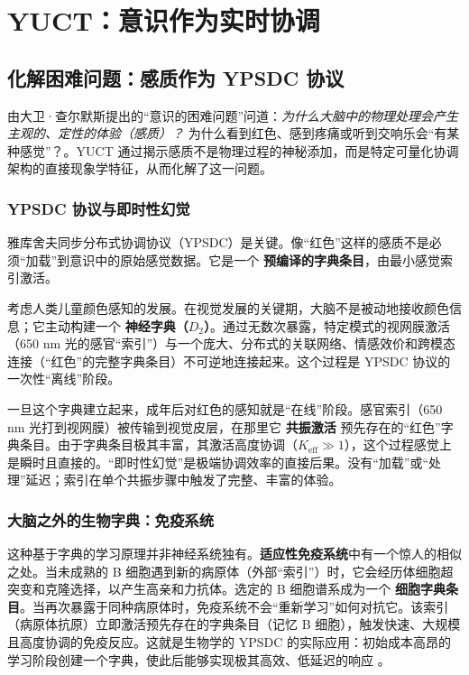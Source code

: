 \documentclass[12pt,a4paper]{article}
\begin{document}
	\section{YUCT：意识作为实时协调}
	
	\subsection{化解困难问题：感质作为 YPSDC 协议}
	
	由大卫·查尔默斯提出的“意识的困难问题”问道：\textit{为什么大脑中的物理处理会产生主观的、定性的体验（感质）？} 为什么看到红色、感到疼痛或听到交响乐会“有某种感觉”？\cite{Chalmers1995}。YUCT 通过揭示感质不是物理过程的神秘添加，而是特定可量化协调架构的直接现象学特征，从而化解了这一问题。
	
	\subsubsection{YPSDC 协议与即时性幻觉}
	
	雅库舍夫同步分布式协调协议（YPSDC）是关键。像“红色”这样的感质不是必须“加载”到意识中的原始感觉数据。它是一个 \textbf{预编译的字典条目}，由最小感觉索引激活。
	
	考虑人类儿童颜色感知的发展。在视觉发展的关键期，大脑不是被动地接收颜色信息；它主动构建一个 \textbf{神经字典（\(D_2\)）}。通过无数次暴露，特定模式的视网膜激活（650 nm 光的感官“索引”）与一个庞大、分布式的关联网络、情感效价和跨模态连接（“红色”的完整字典条目）不可逆地连接起来。这个过程是 YPSDC 协议的一次性“离线”阶段。
	
	一旦这个字典建立起来，成年后对红色的感知就是“在线”阶段。感官索引（650 nm 光打到视网膜）被传输到视觉皮层，在那里它 \textbf{共振激活} 预先存在的“红色”字典条目。由于字典条目极其丰富，其激活高度协调（\(K_{\mathrm{eff}} \gg 1\)），这个过程感觉上是瞬时且直接的。“即时性幻觉”是极端协调效率的直接后果。没有“加载”或“处理”延迟；索引在单个共振步骤中触发了完整、丰富的体验。
	
	\subsubsection{大脑之外的生物字典：免疫系统}
	
	这种基于字典的学习原理并非神经系统独有。\textbf{适应性免疫系统}中有一个惊人的相似之处。当未成熟的 B 细胞遇到新的病原体（外部“索引”）时，它会经历体细胞超突变和克隆选择，以产生高亲和力抗体。选定的 B 细胞谱系成为一个 \textbf{细胞字典条目}。当再次暴露于同种病原体时，免疫系统不会“重新学习”如何对抗它。该索引（病原体抗原）立即激活预先存在的字典条目（记忆 B 细胞），触发快速、大规模且高度协调的免疫反应。这就是生物学的 YPSDC 的实际应用：初始成本高昂的学习阶段创建一个字典，使此后能够实现极其高效、低延迟的响应 \cite{Alberts2014}。
	
\end{document}
